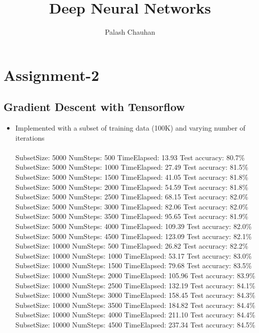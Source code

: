 \documentclass{article}
\begin{document}
\title{Deep Neural Networks}
\author{Palash Chauhan}

\maketitle

\section{Assignment-2}

\subsection{Gradient Descent with Tensorflow}
\begin{itemize}
	\item Implemented with a subset of training data (100K) and varying number of iterations \\ \\
	SubsetSize: 5000 NumSteps: 500 TimeElapsed: 13.93 Test accuracy: 80.7\% \\
SubsetSize: 5000 NumSteps: 1000 TimeElapsed: 27.49 Test accuracy: 81.5\% \\
SubsetSize: 5000 NumSteps: 1500 TimeElapsed: 41.05 Test accuracy: 81.8\% \\
SubsetSize: 5000 NumSteps: 2000 TimeElapsed: 54.59 Test accuracy: 81.8\% \\
SubsetSize: 5000 NumSteps: 2500 TimeElapsed: 68.15 Test accuracy: 82.0\% \\
SubsetSize: 5000 NumSteps: 3000 TimeElapsed: 82.06 Test accuracy: 82.0\% \\
SubsetSize: 5000 NumSteps: 3500 TimeElapsed: 95.65 Test accuracy: 81.9\% \\
SubsetSize: 5000 NumSteps: 4000 TimeElapsed: 109.39 Test accuracy: 82.0\% \\
SubsetSize: 5000 NumSteps: 4500 TimeElapsed: 123.09 Test accuracy: 82.1\% \\

SubsetSize: 10000 NumSteps: 500 TimeElapsed: 26.82 Test accuracy: 82.2\% \\
SubsetSize: 10000 NumSteps: 1000 TimeElapsed: 53.17 Test accuracy: 83.0\% \\
SubsetSize: 10000 NumSteps: 1500 TimeElapsed: 79.68 Test accuracy: 83.5\% \\
SubsetSize: 10000 NumSteps: 2000 TimeElapsed: 105.96 Test accuracy: 83.9\% \\
SubsetSize: 10000 NumSteps: 2500 TimeElapsed: 132.19 Test accuracy: 84.1\% \\
SubsetSize: 10000 NumSteps: 3000 TimeElapsed: 158.45 Test accuracy: 84.3\% \\
SubsetSize: 10000 NumSteps: 3500 TimeElapsed: 184.82 Test accuracy: 84.4\% \\
SubsetSize: 10000 NumSteps: 4000 TimeElapsed: 211.10 Test accuracy: 84.4\% \\
SubsetSize: 10000 NumSteps: 4500 TimeElapsed: 237.34 Test accuracy: 84.5\% \\


\end{itemize}
\end{document}
